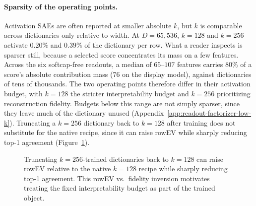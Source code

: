 \paragraph{Sparsity of the operating points.}
Activation SAEs are often reported at smaller absolute $k$, but $k$ is
comparable across dictionaries only relative to width. At $D=65{,}536$,
$k=128$ and $k=256$ activate $0.20\%$ and $0.39\%$ of the dictionary per
row. What a reader inspects is sparser still, because a selected score
concentrates its mass on a few features. Across the six softcap-free
readouts, a
median of $65$--$107$ features carries $80\%$ of a score's absolute
contribution mass ($76$ on the display model), against dictionaries of
tens of thousands. The two operating points therefore differ in their
activation budget, with $k=128$ the stricter interpretability budget and
$k=256$ prioritizing reconstruction fidelity. Budgets below this range
are not simply sparser, since they leave much of the dictionary unused
(Appendix~\ref{app:readout-factorizer-low-k}). Truncating a $k=256$
dictionary back to $k=128$ after training does not substitute for the
native recipe, since it can raise rowEV while sharply reducing top-1
agreement (Figure~\ref{fig:app-k-truncation-inversion}).

\begin{figure}[!tbp]
    \centering
    \caption{
        Truncating $k=256$-trained dictionaries back to $k=128$ can raise
        rowEV relative to the native $k=128$ recipe while sharply reducing
        top-1 agreement. This rowEV vs.\ fidelity inversion motivates treating
        the fixed interpretability budget as part of the trained object.
    }
    \label{fig:app-k-truncation-inversion}
\end{figure}

\ReadoutSAEFloatBarrier
